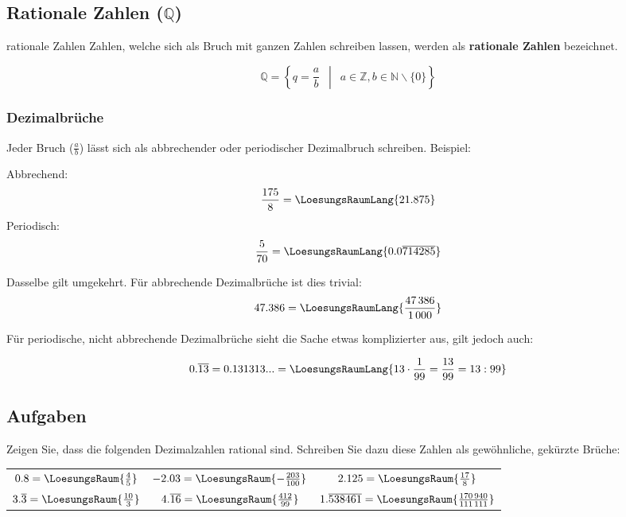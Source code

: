 \subsection{Rationale Zahlen ($\mathbb{Q}$)}

\begin{definition}{rationale Zahlen}{}
Zahlen, welche sich als Bruch mit ganzen Zahlen schreiben lassen,
werden als \textbf{rationale Zahlen} bezeichnet.


$$\mathbb{Q} =\left\{ q = \frac{a}{b} \,\,\, \middle| \,\,\, a \in \mathbb{Z}, b \in \mathbb{N}\backslash{}\{0\}\right\}$$
\end{definition}

\subsubsection{Dezimalbrüche}
Jeder Bruch ($\frac{a}{b}$) lässt sich als
abbrechender oder periodischer Dezimalbruch schreiben. Beispiel:

Abbrechend:
$$\frac{175}{8} = \LoesungsRaumLang{21.875}$$
Periodisch:
$$\frac{5}{70} = \LoesungsRaumLang{0.0\overline{714285}}$$

Dasselbe gilt umgekehrt. Für abbrechende Dezimalbrüche ist dies
trivial:
$$47.386 = \LoesungsRaumLang{\frac{47\,386}{1\,000}}$$

Für periodische, nicht abbrechende Dezimalbrüche sieht die Sache etwas komplizierter aus,
gilt jedoch auch:

$$0.\overline{13} = 0.131313... = \LoesungsRaumLang{13\cdot{}\frac1{99}=\frac{13}{99} = 13 : 99}$$



  \subsection*{Aufgaben}
  Zeigen Sie, dass die folgenden Dezimalzahlen rational sind. Schreiben Sie dazu diese Zahlen als gewöhnliche, gekürzte Brüche:

  \renewcommand{\arraystretch}{1.5}
  \begin{tabular}{|c|c|c|}
  $0.8=\LoesungsRaum{\frac45}$                  & $-2.03=\LoesungsRaum{-\frac{203}{100}}$         & $2.125=\LoesungsRaum{\frac{17}{8}}$                             \\
  $3.\overline{3}=\LoesungsRaum{\frac{10}{3} }$ & $4.\overline{16}=\LoesungsRaum{\frac{412}{99}}$ & $1.\overline{538461} =\LoesungsRaum{\frac{170\,940}{111\,111}}$ 
  \end{tabular} 
  \renewcommand{\arraystretch}{1}


